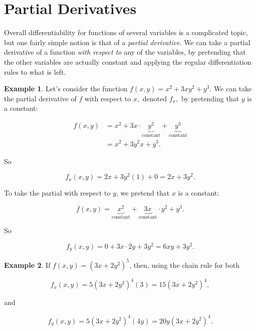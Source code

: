 \documentclass[
]{book}
\theoremstyle{definition}
\theoremstyle{definition}
\newtheorem{example}{Example}[chapter]
\theoremstyle{definition}
\theoremstyle{definition}
\theoremstyle{remark}
\begin{document}
\section{Partial Derivatives}\label{partial-derivatives}

Overall differentiability for functions of several variables is a complicated topic, but one fairly simple notion is that of a \emph{partial derivative}. We can take a partial derivative of a function \emph{with respect to} any of the variables, by pretending that the other variables are actually constant and applying the regular differentiation rules to what is left.

\begin{examplebox}

\begin{example}
\protect\hypertarget{exm:pd1}{}\label{exm:pd1}Let's consider the function \(f(x,y)=x^2+3xy^2+y^3.\)
We can take the partial derivative of \(f\) with respect to \(x,\) denoted \(f_x,\) by pretending that \(y\) is a constant:

\begin{align*}
f(x,y)&=x^2+3x\cdot\underbrace{y^2}_{\text{constant}}+\underbrace{y^3}_{\text{constant}}\\
&=x^2+3y^2x+y^3.
\end{align*}

So

\[f_x(x,y)=2x+3y^2(1)+0=2x+3y^2.\]

To take the partial with respect to \(y\), we pretend that \(x\) is a constant:

\[f(x,y)=\underbrace{x^2}_{\text{constant}}+\underbrace{3x}_{\text{constant}}\cdot y^2+y^3.\]

So

\[f_y(x,y)=0+3x\cdot 2y+3y^2=6xy+3y^2.\]
\end{example}

\end{examplebox}

\begin{examplebox}

\begin{example}
If \(f(x,y)=(3x+2y^2)^5\), then, using the chain rule for both

\[f_x(x,y)=5(3x+2y^2)^4(3)=15(3x+2y^2)^4,\]

and

\[f_y(x,y)=5(3x+2y^2)^4(4y)=20y(3x+2y^2)^4.\]
\end{example}

\end{examplebox}
\end{document}
